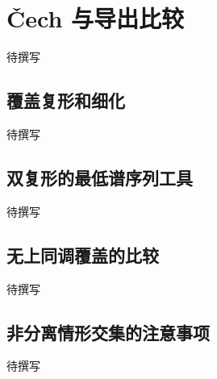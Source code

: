 
% 
% 

\section{Čech 与导出比较}
\label{g5:sec:1802}

待撰写

\subsection{覆盖复形和细化}
\label{g5:subsec:1802:01}
待撰写

\subsection{双复形的最低谱序列工具}
\label{g5:subsec:1802:02}
待撰写

\subsection{无上同调覆盖的比较}
\label{g5:subsec:1802:03}
待撰写

\subsection{非分离情形交集的注意事项}
\label{g5:subsec:1802:04}
待撰写
